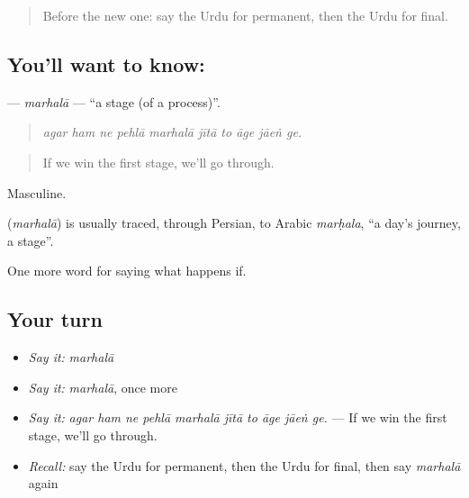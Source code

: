 \label{lesson:UR-C545-marhala}



\begin{quote}
Before the new one: say the Urdu for permanent, then the Urdu for final.
\end{quote}

\subsection*{You'll want to know: }
\textbf{} — \emph{marhalā} — \textquotedblleft{}a stage (of a process)\textquotedblright{}.

\begin{quote}
         
\end{quote}

\begin{quote}
\emph{agar ham ne pehlā marhalā jītā to āge jāeṅ ge.}
\end{quote}

\begin{quote}
If we win the first stage, we'll go through.
\end{quote}

Masculine.

\begin{cousinweb}
\textbf{} (\emph{marhalā}) is usually traced, through Persian, to Arabic \emph{marḥala}, \textquotedblleft{}a day's journey, a stage\textquotedblright{}.
\end{cousinweb}

\begin{grammarlens}[title={What you've built}]
One more word for saying what happens if.
\end{grammarlens}

\subsection*{Your turn}
\begin{itemize}
\raggedright
  \item \emph{Say it:} \emph{marhalā}
  \item \emph{Say it:} \emph{marhalā}, once more
  \item \emph{Say it:} \emph{agar ham ne pehlā marhalā jītā to āge jāeṅ ge.} — If we win the first stage, we'll go through.
  \item \emph{Recall:} say the Urdu for permanent, then the Urdu for final, then say \emph{marhalā} again
\end{itemize}

